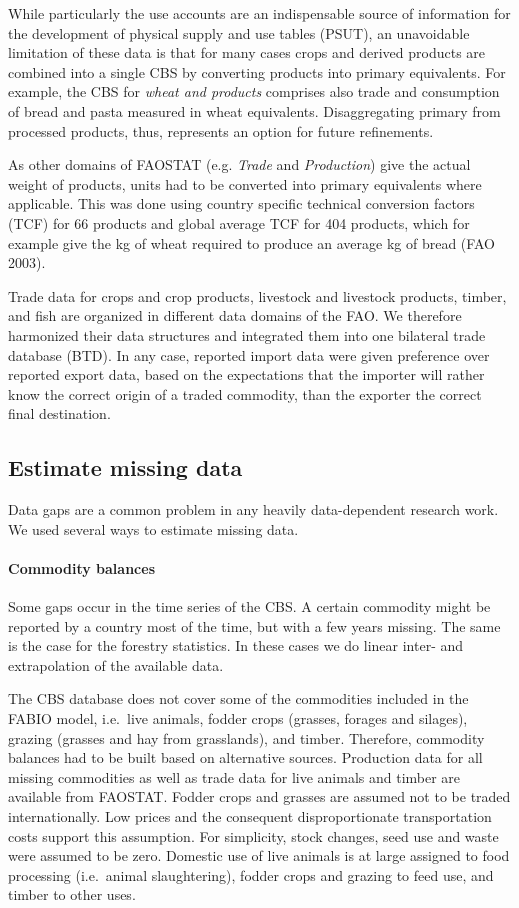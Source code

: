 \documentclass[]{article}
\let\oldparagraph\paragraph
\renewcommand{\paragraph}[1]{\oldparagraph{#1}\mbox{}}
\begin{document}
While particularly the use accounts are an indispensable source of
information for the development of physical supply and use tables
(PSUT), an unavoidable limitation of these data is that for many cases
crops and derived products are combined into a single CBS by converting
products into primary equivalents. For example, the CBS for \emph{wheat
and products} comprises also trade and consumption of bread and pasta
measured in wheat equivalents. Disaggregating primary from processed
products, thus, represents an option for future refinements.

As other domains of FAOSTAT (e.g. \emph{Trade} and \emph{Production})
give the actual weight of products, units had to be converted into
primary equivalents where applicable. This was done using country
specific technical conversion factors (TCF) for 66 products and global
average TCF for 404 products, which for example give the kg of wheat
required to produce an average kg of bread (FAO 2003).

Trade data for crops and crop products, livestock and livestock
products, timber, and fish are organized in different data domains of
the FAO. We therefore harmonized their data structures and integrated
them into one bilateral trade database (BTD). In any case, reported
import data were given preference over reported export data, based on
the expectations that the importer will rather know the correct origin
of a traded commodity, than the exporter the correct final destination.

\subsection{Estimate missing data}\label{estimate-missing-data}

Data gaps are a common problem in any heavily data-dependent research
work. We used several ways to estimate missing data.

\paragraph{Commodity balances}\label{commodity-balances}

Some gaps occur in the time series of the CBS. A certain commodity might
be reported by a country most of the time, but with a few years missing.
The same is the case for the forestry statistics. In these cases we do
linear inter- and extrapolation of the available data.

The CBS database does not cover some of the commodities included in the
FABIO model, i.e.~live animals, fodder crops (grasses, forages and
silages), grazing (grasses and hay from grasslands), and timber.
Therefore, commodity balances had to be built based on alternative
sources. Production data for all missing commodities as well as trade
data for live animals and timber are available from FAOSTAT. Fodder
crops and grasses are assumed not to be traded internationally. Low
prices and the consequent disproportionate transportation costs support
this assumption. For simplicity, stock changes, seed use and waste were
assumed to be zero. Domestic use of live animals is at large assigned to
food processing (i.e.~animal slaughtering), fodder crops and grazing to
feed use, and timber to other uses.
\end{document}
